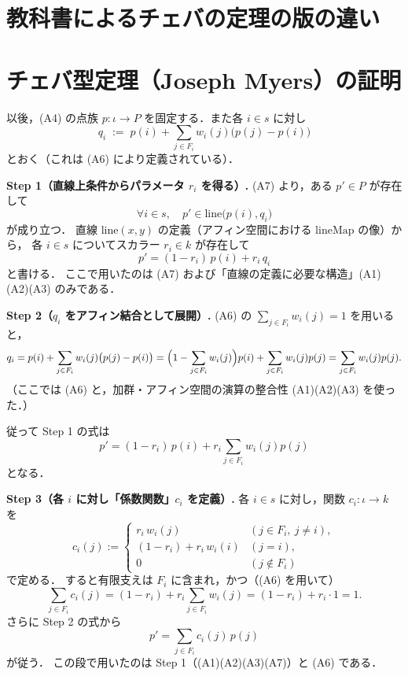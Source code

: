 \documentclass[a4paper,12pt]{bxjsbook}
\makeatletter
\newlength{\customindent}
\newenvironment{body}{
  \par
  \begingroup
  \setlength{\leftskip}{\customindent}
  \setlength{\rightskip}{0pt}
  \setlength{\parindent}{1em}
  \setlength{\displayindent}{\customindent}
  \setlength{\displaywidth}{\dimexpr\linewidth-\customindent\relax}
}{
  \par
  \endgroup
}
\theoremstyle{theorem}
\renewenvironment{proof}[1][\proofname]{%
  \par\pushQED{\qed}%
  \normalfont
  \topsep6\p@\@plus6\p@\relax
  \list{}{%
    \leftmargin=\customindent
    \rightmargin=0pt
    \labelwidth=0pt
    \labelsep=0pt
    \itemindent=0pt
    \listparindent=0pt
    \parsep=0pt
  }%
  \item[\itshape #1\@addpunct{.}\hspace{0.5em}]%
  \setlength{\displayindent}{\customindent}%
  \setlength{\displaywidth}{\dimexpr\linewidth-\customindent\relax}%
  \ignorespaces
}{%
  \popQED\endlist\@endpefalse
}
\makeatother
\begin{document}
\begin{body}
    \chapter{教科書によるチェバの定理の版の違い}


    \chapter{チェバ型定理（Joseph Myers）の証明}
    \begin{proof}
      以後，(A4) の点族 $p:\iota\to P$ を固定する．また各 $i\in s$ に対し
      \[
      q_i \;:=\; p(i)+\sum_{j\in F_i} w_i(j)\bigl(p(j)-p(i)\bigr)
      \]
      とおく（これは (A6) により定義されている）．

      \medskip
      \noindent\textbf{Step 1（直線上条件からパラメータ $r_i$ を得る）.}
      (A7) より，ある $p'\in P$ が存在して
      \[
      \forall i\in s,\quad p'\in \mathrm{line}\bigl(p(i),q_i\bigr)
      \]
      が成り立つ．
      直線 $\mathrm{line}(x,y)$ の定義（アフィン空間における $\mathrm{lineMap}$ の像）から，
      各 $i\in s$ についてスカラー $r_i\in k$ が存在して
      \[
      p'=(1-r_i)\,p(i)+r_i\,q_i
      \]
      と書ける．
      ここで用いたのは (A7) および「直線の定義に必要な構造」(A1)(A2)(A3) のみである．

      \medskip
      \noindent\textbf{Step 2（$q_i$ をアフィン結合として展開）.}
      (A6) の $\sum_{j\in F_i} w_i(j)=1$ を用いると，
      \[
      q_i
      =p(i)+\sum_{j\in F_i} w_i(j)\bigl(p(j)-p(i)\bigr)
      =\Bigl(1-\sum_{j\in F_i}w_i(j)\Bigr)p(i)+\sum_{j\in F_i}w_i(j)p(j)
      =\sum_{j\in F_i}w_i(j)p(j).
      \]
      （ここでは (A6) と，加群・アフィン空間の演算の整合性 (A1)(A2)(A3) を使った．）

      従って Step 1 の式は
      \[
      p'=(1-r_i)\,p(i)+r_i\sum_{j\in F_i}w_i(j)p(j)
      \]
      となる．

      \medskip
      \noindent\textbf{Step 3（各 $i$ に対し「係数関数」$c_i$ を定義）.}
      各 $i\in s$ に対し，関数 $c_i:\iota\to k$ を
      \[
      c_i(j):=
      \begin{cases}
          r_i\,w_i(j) & (j\in F_i,\ j\neq i),\\
          (1-r_i)+r_i\,w_i(i) & (j=i),\\
          0 & (j\notin F_i)
      \end{cases}
      \]
      で定める．
      すると有限支えは $F_i$ に含まれ，かつ（(A6) を用いて）
      \[
      \sum_{j\in F_i}c_i(j)
      =(1-r_i)+r_i\sum_{j\in F_i}w_i(j)
      =(1-r_i)+r_i\cdot 1
      =1.
      \]
      さらに Step 2 の式から
      \[
      p'=\sum_{j\in F_i}c_i(j)\,p(j)
      \]
      が従う．
      この段で用いたのは Step 1（(A1)(A2)(A3)(A7)）と (A6) である．


\end{proof}
\end{body}
\end{document}
